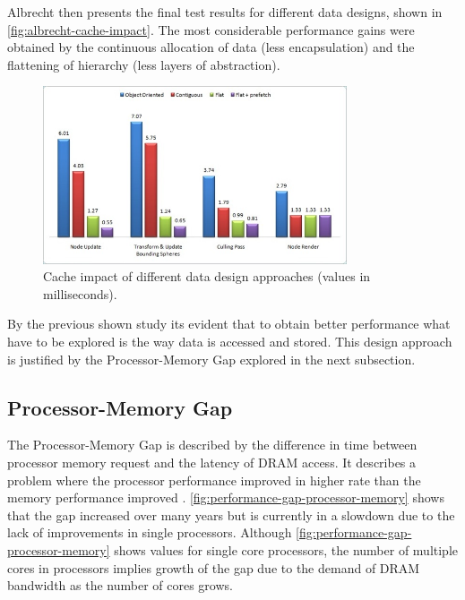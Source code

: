     Albrecht then presents the final test results for different data designs, shown in \autoref{fig:albrecht-cache-impact}. The most considerable performance gains were obtained by the continuous allocation of data (less encapsulation) and the flattening of hierarchy (less layers of abstraction).  
    
    \begin{figure}[H]
        \caption{
        \label{fig:albrecht-cache-impact}
            Cache impact of different data design approaches (values in milliseconds).
        }
        \begin{center}
        \includegraphics[width=0.8\textwidth]{images/albrecht-cache-impact.jpg}
        \end{center}
    \end{figure}
    
    By the previous shown study its evident that to obtain better performance what have to be explored is the way data is accessed and stored. This design approach is justified by the Processor-Memory Gap explored in the next subsection.

\subsection{Processor-Memory Gap}
    
    The Processor-Memory Gap is described by the difference in time between processor memory request and the latency of DRAM access. It describes a problem where the processor performance improved in higher rate than the memory performance improved \cite{computer-architecture-a-quantitative-approach-6ed}. \autoref{fig:performance-gap-processor-memory} shows that the gap increased over many years but is currently in a slowdown due to the lack of improvements in single processors. Although \autoref{fig:performance-gap-processor-memory} shows values for single core processors, the number of multiple cores in processors implies growth of the gap due to the demand of DRAM bandwidth as the number of cores grows.
    
